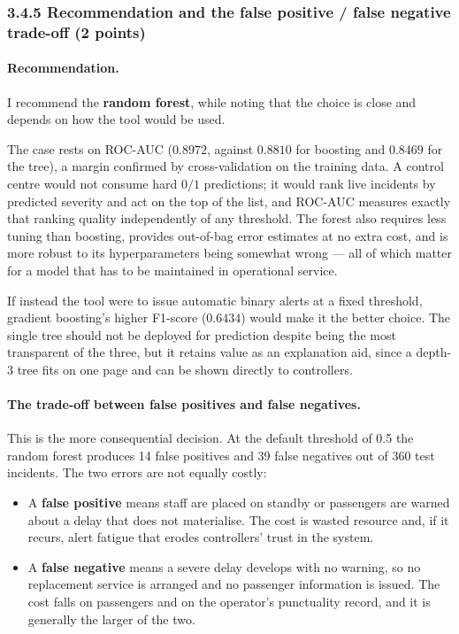 \documentclass[11pt,a4paper]{article}
\begin{document}
\subsubsection*{3.4.5 Recommendation and the false positive / false negative trade-off (2 points)}

\paragraph{Recommendation.} I recommend the \textbf{random forest}, while noting that the
choice is close and depends on how the tool would be used.

The case rests on ROC-AUC ($0.8972$, against $0.8810$ for boosting and $0.8469$ for the
tree), a margin confirmed by cross-validation on the training data. A control centre would
not consume hard $0/1$ predictions; it would rank live incidents by predicted severity and
act on the top of the list, and ROC-AUC measures exactly that ranking quality independently
of any threshold. The forest also requires less tuning than boosting, provides out-of-bag
error estimates at no extra cost, and is more robust to its hyperparameters being somewhat
wrong --- all of which matter for a model that has to be maintained in operational service.

If instead the tool were to issue automatic binary alerts at a fixed threshold, gradient
boosting's higher F1-score ($0.6434$) would make it the better choice. The single tree
should not be deployed for prediction despite being the most transparent of the three, but
it retains value as an explanation aid, since a depth-3 tree fits on one page and can be
shown directly to controllers.

\paragraph{The trade-off between false positives and false negatives.} This is the more
consequential decision. At the default threshold of 0.5 the random forest produces 14 false
positives and 39 false negatives out of 360 test incidents. The two errors are not equally
costly:

\begin{itemize}[leftmargin=2em]
\item A \textbf{false positive} means staff are placed on standby or passengers are warned
about a delay that does not materialise. The cost is wasted resource and, if it recurs,
alert fatigue that erodes controllers' trust in the system.
\item A \textbf{false negative} means a severe delay develops with no warning, so no
replacement service is arranged and no passenger information is issued. The cost falls on
passengers and on the operator's punctuality record, and it is generally the larger of the
two.
\end{itemize}
\end{document}
